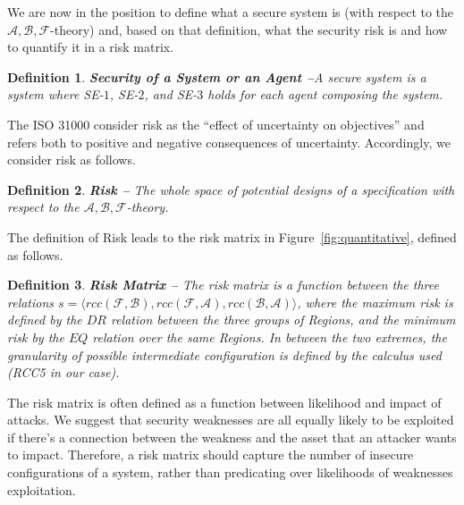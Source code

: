 \documentclass[conference]{IEEEtran}
\newcommand{\assertionRegion}{\mathcal{A}}
\newcommand{\beliefRegion}{\mathcal{B}}
\newcommand{\factRegion}{\mathcal{F}}
\newcommand{\rcc}{rcc}
\newcommand{\abf}{\assertionRegion,\beliefRegion,\factRegion}
\newtheorem{definition}{Definition}%
\begin{document}
We are now in the position to define what a secure system is (with respect to
the $\abf$-theory) and, based on that definition, what the security risk is and
how to quantify it in a risk matrix.
\begin{definition}{\bf Security of a System or an Agent --}\label{def:security}
	A secure system is a system where SE-$1$, SE-$2$, and SE-$3$ holds for
	each agent composing the system.
\end{definition}
The ISO 31000 consider risk as the ``effect of uncertainty on objectives'' and
refers both to positive and negative consequences of uncertainty.
Accordingly, we consider risk as follows. 
\begin{definition}{\bf Risk --}
The whole space of potential designs of a specification with respect to the
	$\abf$-theory.
\end{definition}
The definition of Risk leads to the risk matrix in
Figure~\ref{fig:quantitative}, defined as follows.
\begin{definition}{\bf Risk Matrix --}
	The risk matrix is a function between the three relations
	$s=\langle\rcc(\factRegion,\beliefRegion),\rcc(\factRegion,\assertionRegion),\rcc(\beliefRegion,\assertionRegion)\rangle$,
	where the maximum risk is defined by the $DR$ relation between the
	three groups of Regions, and the minimum risk by the $EQ$ relation over
	the same Regions. In between the two extremes, the granularity of
	possible intermediate configuration is defined by the calculus used
	(RCC5 in our case).
\end{definition}
The risk matrix is often defined as a function between 
likelihood and impact of attacks. We suggest
that security weaknesses are all equally likely to be exploited
if there's a connection between the weakness and the asset that
an attacker wants to impact. Therefore, a risk matrix should
capture the number of insecure configurations of a system, rather
than predicating over likelihoods of weaknesses exploitation.
\end{document}
